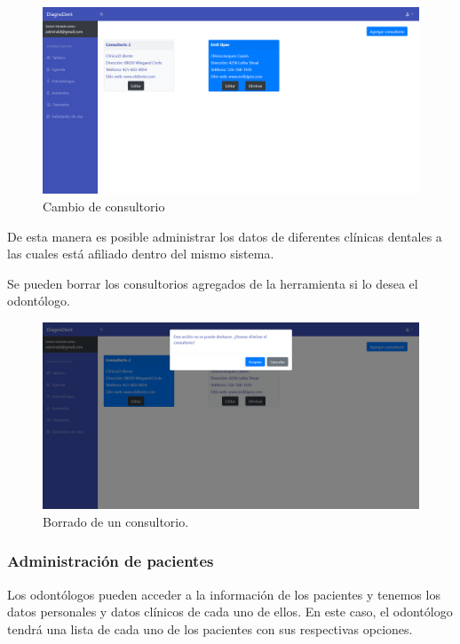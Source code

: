 \begin{figure}[H]
\centering
\includegraphics[width=17cm,keepaspectratio]{pictures/adminodo/login/consultorio-4.png}
\caption{Cambio de consultorio}
\end{figure}

De esta manera es posible administrar los datos de diferentes clínicas dentales a las cuales está afiliado dentro del mismo sistema.

\vspace{1em}
Se pueden borrar los consultorios agregados de la herramienta si lo desea el odontólogo. 

\begin{figure}[H]
\centering
\includegraphics[width=17cm,keepaspectratio]{pictures/adminodo/login/borrar-consultorio.png}
\caption{Borrado de un consultorio.}
\end{figure}

\newpage
\subsubsection{Administración de pacientes}
Los odontólogos pueden acceder a la información de los pacientes y tenemos los datos personales y datos clínicos de cada uno de ellos.
En este caso, el odontólogo tendrá una lista de cada uno de los pacientes con sus respectivas opciones.

